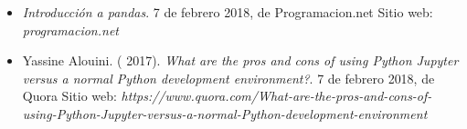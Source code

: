 \documentclass[a4paper]{article}
\begin{document}

\begin{itemize}
\item \textit{Introducción a pandas}. 7 de febrero 2018, de Programacion.net Sitio web: \textit{programacion.net}

\item Yassine Alouini. ( 2017). \textit{What are the pros and cons of using Python Jupyter versus a normal Python development environment?}. 7 de febrero 2018, de Quora Sitio web:\textit{ https://www.quora.com/What-are-the-pros-and-cons-of-using-Python-Jupyter-versus-a-normal-Python-development-environment}
\end{itemize}
\end{document}
